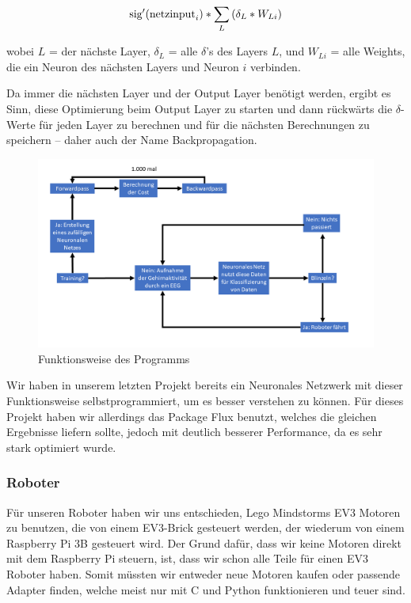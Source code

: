 \documentclass{scrartcl}
\begin{document}
	{\Large \[\textrm{sig}'({\textrm{netzinput}}_i) * \sum_{L}{\left(\delta_L\ast W_{Li}\right)}\]}
		
	\noindent wobei $L$ = der nächste Layer, $\delta_L$ = alle $\delta$'s des Layers $L$, und $W_{Li}$ = alle Weights, die ein Neuron des nächsten Layers und Neuron $i$ verbinden.


	Da immer die nächsten Layer und der Output Layer benötigt werden, ergibt es Sinn, diese Optimierung beim Output Layer zu starten und dann rückwärts die \mbox{$\delta$-Werte} für jeden Layer zu berechnen und für die nächsten Berechnungen zu speichern -- daher auch der Name Backpropagation. \cite{MITNeuronale} \cite{3b1b:fft} \cite{brotcrunsher:backwardpass}

	\begin{figure}[h!]
		\includegraphics[width=\textwidth]{pictures/Abbildung-des-Programms.png}
		\caption{Funktionsweise des Programms}
	\end{figure}
	


	Wir haben in unserem letzten Projekt bereits ein Neuronales Netzwerk mit dieser Funktionsweise selbstprogrammiert, um es besser verstehen zu können. \cite{AIComposer} Für dieses Projekt haben wir allerdings das Package Flux benutzt, welches die gleichen Ergebnisse liefern sollte, jedoch mit deutlich besserer Performance, da es sehr stark optimiert wurde.


	\subsubsection{Roboter}

	Für unseren Roboter haben wir uns entschieden, Lego Mindstorms EV3 Motoren zu benutzen, die von einem EV3-Brick gesteuert werden, der wiederum von einem Raspberry Pi 3B gesteuert wird. Der Grund dafür, dass wir keine Motoren direkt mit dem Raspberry Pi steuern, ist, dass wir schon alle Teile für einen EV3 Roboter haben. Somit müssten wir entweder neue Motoren kaufen oder passende Adapter finden, welche meist nur mit C und Python funktionieren und teuer sind.
\end{document}
